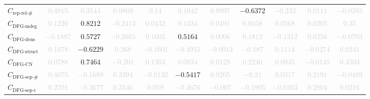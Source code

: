 \documentclass{standalone}
\newcommand{\reprelnumname}{\text{rep-rel-\#}}
\newcommand{\reprelnum}{C_{\reprelnumname}}
\newcommand{\dfgmaxdegname}{\text{DFG-mdeg}}
\newcommand{\dfgmaxdeg}{C_{\dfgmaxdegname}}
\newcommand{\dfgdensname}{\text{DFG-dens}}
\newcommand{\dfgdens}{C_{\dfgdensname}}
\newcommand{\dfgstructname}{\text{DFG-struct}}
\newcommand{\dfgstruct}{C_{\dfgstructname}}
\newcommand{\dfgcycnumbername}{\text{DFG-CN}}
\newcommand{\dfgcycnumber}{C_{\dfgcycnumbername}}
\newcommand{\dfgsepnumname}{\text{DFG-sep-\#}}
\newcommand{\dfgsepnum}{C_{\dfgsepnumname}}
\newcommand{\dfgseprationame}{\text{DFG-sep-r}}
\newcommand{\dfgsepratio}{C_{\dfgseprationame}}
\begin{document}
\begin{tabular}{lcccccccccc}
$\reprelnum$ & \textcolor{lightgray}{$0.4815$} & \textcolor{lightgray}{$0.3544$} & \textcolor{lightgray}{$0.0869$} & \textcolor{lightgray}{$0.14$} & \textcolor{lightgray}{$0.1042$} & \textcolor{lightgray}{$0.0997$} & $-0.6372$ & \textcolor{lightgray}{$-0.232$} & \textcolor{lightgray}{$0.0111$} & \textcolor{lightgray}{$-0.0385$} \\ 
$\dfgmaxdeg$ & \textcolor{lightgray}{$0.1226$} & $0.8212$ & \textcolor{lightgray}{$-0.2413$} & \textcolor{lightgray}{$0.0432$} & \textcolor{lightgray}{$0.1334$} & \textcolor{lightgray}{$0.0491$} & \textcolor{lightgray}{$0.0458$} & \textcolor{lightgray}{$0.0568$} & \textcolor{lightgray}{$0.0205$} & \textcolor{lightgray}{$0.35$} \\ 
$\dfgdens$ & \textcolor{lightgray}{$-0.1887$} & $0.5727$ & \textcolor{lightgray}{$-0.2665$} & \textcolor{lightgray}{$0.1603$} & $0.5164$ & \textcolor{lightgray}{$0.0006$} & \textcolor{lightgray}{$0.1812$} & \textcolor{lightgray}{$-0.1312$} & \textcolor{lightgray}{$0.0256$} & \textcolor{lightgray}{$-0.0703$} \\ 
$\dfgstruct$ & \textcolor{lightgray}{$0.1678$} & $-0.6229$ & \textcolor{lightgray}{$0.268$} & \textcolor{lightgray}{$-0.1601$} & \textcolor{lightgray}{$-0.4915$} & \textcolor{lightgray}{$-0.0013$} & \textcolor{lightgray}{$-0.187$} & \textcolor{lightgray}{$0.1114$} & \textcolor{lightgray}{$-0.0274$} & \textcolor{lightgray}{$0.0241$} \\ 
$\dfgcycnumber$ & \textcolor{lightgray}{$0.0788$} & $0.7464$ & \textcolor{lightgray}{$-0.201$} & \textcolor{lightgray}{$0.1303$} & \textcolor{lightgray}{$0.0934$} & \textcolor{lightgray}{$0.0129$} & \textcolor{lightgray}{$0.2246$} & \textcolor{lightgray}{$0.0945$} & \textcolor{lightgray}{$-0.0145$} & \textcolor{lightgray}{$0.4503$} \\ 
$\dfgsepnum$ & \textcolor{lightgray}{$0.4075$} & \textcolor{lightgray}{$-0.1689$} & \textcolor{lightgray}{$0.3394$} & \textcolor{lightgray}{$-0.0132$} & $-0.5417$ & \textcolor{lightgray}{$0.0205$} & \textcolor{lightgray}{$-0.21$} & \textcolor{lightgray}{$0.0317$} & \textcolor{lightgray}{$0.2191$} & \textcolor{lightgray}{$-0.0489$} \\ 
$\dfgsepratio$ & \textcolor{lightgray}{$0.2701$} & \textcolor{lightgray}{$-0.3677$} & \textcolor{lightgray}{$0.3546$} & \textcolor{lightgray}{$0.059$} & \textcolor{lightgray}{$-0.4676$} & \textcolor{lightgray}{$-0.007$} & \textcolor{lightgray}{$-0.1905$} & \textcolor{lightgray}{$-0.0303$} & \textcolor{lightgray}{$0.2804$} & \textcolor{lightgray}{$0.0216$} \\ 

\end{tabular}
\end{document}

